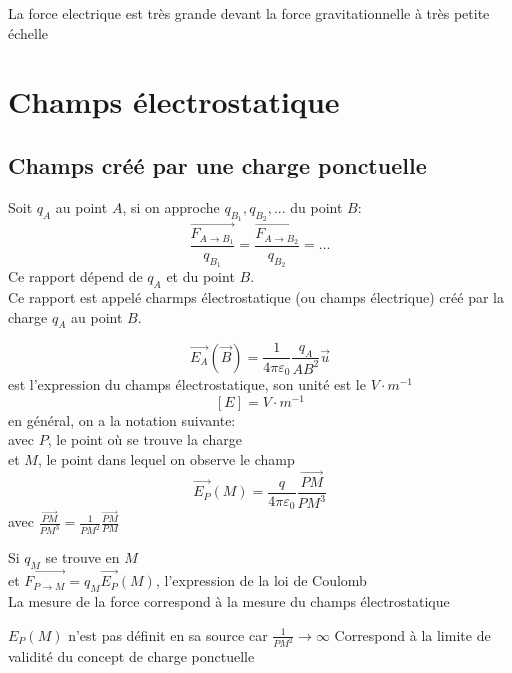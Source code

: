 \documentclass[../main.tex]{subfile}
\begin{document}
La force electrique est très grande devant la force gravitationnelle à très petite échelle

\section{Champs électrostatique}
\subsection{Champs créé par une charge ponctuelle}
Soit $q_A$ au point $A$, si on approche $q_{B_1}, q_{B_2}, ...$ du point $B$:
$$\frac{\vec{F_{A \to B_1}}}{q_{B_1}} = \frac{\vec{F_{A \to B_2}}}{q_{B_2}} = ...$$
Ce rapport dépend de $q_A$ et du point $B$.\\
Ce rapport est appelé charmps électrostatique (ou champs électrique) créé par la charge $q_A$ au point $B$.

$$\vec{E_A}(\vec{B}) = \frac{1}{4 \pi \varepsilon_0} \frac{q_A}{AB^2} \vec{u}$$
est l'expression du champs électrostatique, son unité est le $V \cdot m^{-1}$
$$[E] = V \cdot m^{-1}$$
en général, on a la notation suivante:\\
avec $P$, le point où se trouve la charge\\
et $M$, le point dans lequel on observe le champ
$$\vec{E_P}(M) = \frac{q}{4\pi \varepsilon_0} \frac{\vec{PM}}{PM^3}$$
avec $\frac{\vec{PM}}{PM^3} = \frac{1}{PM^2} \frac{\vec{PM}}{PM}$\\

\begin{rema}
	Si $q_M$ se trouve en $M$\\
	et $\vec{F_{P \to M}} = q_M \vec{E_P}(M)$, l'expression de la loi de Coulomb\\
	La mesure de la force correspond à la mesure du champs électrostatique
\end{rema}

\begin{rema}
	$E_P(M)$ n'est pas définit en sa source car $\frac{1}{PM^2} \to \infty$
	Correspond à la limite de validité du concept de charge ponctuelle
\end{rema}
\end{document}
